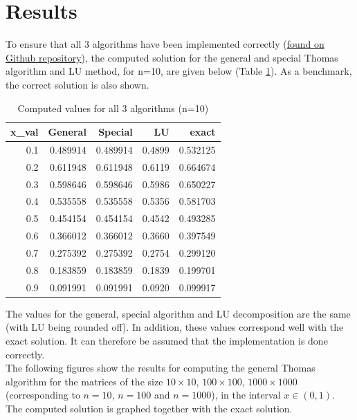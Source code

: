\documentclass[%
oneside,                 %
final,                   %
10pt]{article}
\begin{document}
\section*{Results}
To ensure that all 3 algorithms have been implemented correctly
(\href{https://github.com/EliasTRuud/FYS3150/tree/master/Project1}{found on Github repository}),
the computed solution for the general and special Thomas algorithm and LU method, for n=10, are given below (Table \ref{tbl:Values_n10}). As a benchmark, the correct solution is also shown.
\begin{table}[H]
\caption{Computed values for all 3 algorithms (n=10)}
\centering
\begin{tabular}{rrrrr}
\toprule
 x\_val &  General &  Special &   LU &   exact \\
\midrule
  0.1 & 0.489914 & 0.489914 & 0.4899 & 0.532125 \\
  0.2 & 0.611948 & 0.611948 & 0.6119 & 0.664674 \\
  0.3 & 0.598646 & 0.598646 & 0.5986 & 0.650227 \\
  0.4 & 0.535558 & 0.535558 & 0.5356 & 0.581703 \\
  0.5 & 0.454154 & 0.454154 & 0.4542 & 0.493285 \\
  0.6 & 0.366012 & 0.366012 & 0.3660 & 0.397549 \\
  0.7 & 0.275392 & 0.275392 & 0.2754 & 0.299120 \\
  0.8 & 0.183859 & 0.183859 & 0.1839 & 0.199701 \\
  0.9 & 0.091991 & 0.091991 & 0.0920 & 0.099917 \\
\bottomrule
\end{tabular}
\label{tbl:Values_n10}
\end{table}
The values for the general, special algorithm and LU decomposition are the same (with LU being rounded off). In addition, these values correspond well with the exact solution. It can therefore be assumed that the implementation is done correctly. \\

The following figures show the results for computing the general Thomas algorithm for the matrices of the size $10 \times 10$, $100 \times 100$, $1000 \times 1000$ (corresponding to $n=10$, $n=100$ and $n=1000$), in the interval $x \in (0,1)$. The computed solution is graphed together with the exact solution.
\end{document}
